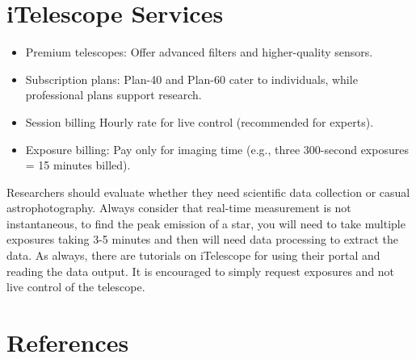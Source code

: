 \documentclass[12pt,oneside,a4paper,english]{article}
\begin{document}
\section{iTelescope Services}\cite{session_billing}
\begin{itemize}
    \item Premium telescopes: Offer advanced filters and higher-quality sensors.
    \item Subscription plans: Plan-40 and Plan-60 cater to individuals, while professional plans support research.
    \item Session billing Hourly rate for live control (recommended for experts).
    \item Exposure billing: Pay only for imaging time (e.g., three 300-second exposures = 15 minutes billed).
  
\end{itemize}
Researchers should evaluate whether they need scientific data collection or casual astrophotography. Always consider that real-time measurement is not instantaneous, to find the peak emission of a star, you will need to take multiple exposures taking 3-5 minutes and then will need data processing to extract the data. As always, there are tutorials on iTelescope for using their portal and reading the data output. It is encouraged to simply request exposures and not live control of the telescope.
\newpage
\section{References}


\end{document}
